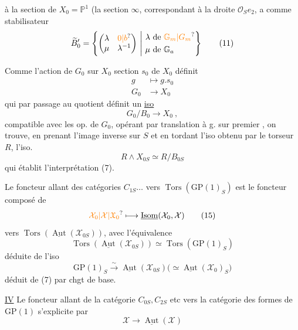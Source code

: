 à la section   de  $X_0=\mathbb P^1$ (la section $\infty$, correspondant à la droite $\mathcal O_S e_2$, a comme stabilisateur
\[
\widetilde B'_0=\left\{\begin{pmatrix}\lambda&\unsure{0|b}\\ \mu&\lambda^{-1}\end{pmatrix}\ \middle|\ 
\begin{aligned}\lambda&\ \text{de }\unsure{\mathbb G_m|G_m}\\ \mu&\ \text{de }\mathbb G_a\end{aligned}\right\} \tag*{(11)}
\]

Comme l'action de $G_0$ sur $X_0$  section $s_0$ de $X_0$ définit
\[
\begin{aligned}g&\longmapsto g.s_0\\G_0&\longrightarrow X_0\end{aligned}\tag*{(12)}
\]
qui par passage au quotient définit un \uline{iso}
\[
G_0/B_0\longrightarrow X_0\ ,\tag*{(13)}
\]
 compatible avec les op. de $G_0$, opérant par translation à g. sur  premier , on trouve, en prenant l'image inverse sur $S$ et en tordant l'iso obtenu par le torseur $R$, l'iso.
\[
R\wedge X_{0S}\simeq R/B_{0S}\tag*{(14)}
\]
qui établit l'interprétation (7).

Le foncteur allant des  catégories $C_{1S}\ldots$ vers $\operatorname{Tors}(\mathrm{GP}(1)_S)$ est le foncteur composé de
\[
\unsure{\mathcal X_0|\mathcal X|\mathfrak X_0}\longmapsto\underline{\operatorname{Isom}}(\mathcal X_0,\mathcal X)\tag*{(15)}
\]
vers  $\operatorname{Tors}(\underline{\operatorname{Aut}}(\mathcal X_{0S}))$, avec l'équivalence
\[
\operatorname{Tors}(\underline{\operatorname{Aut}}(\mathcal X_{0S}))\simeq\operatorname{Tors}(\mathrm{GP}(1)_S)\tag*{(16)}
\]
déduite de l'iso 
\[
\mathrm{GP}(1)_S\xrightarrow{\sim}\underline{\operatorname{Aut}}(\mathcal X_{0S})\bigl(\simeq\underline{\operatorname{Aut}}(\mathcal X_0)_S\bigr)\tag*{(17)}
\]
déduit de (7) par chgt de base.


\uline{IV} Le foncteur allant de la catégorie   $C_{0S}, C_{2S}$ etc vers la catégorie  des formes de $\mathrm{GP}(1)$ s'explicite par
\[
\mathcal X\longrightarrow\underline{\operatorname{Aut}}(\mathcal X)\tag*{(18)}
\]


